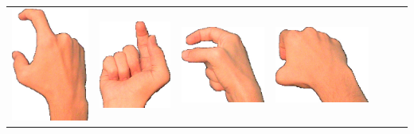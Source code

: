 \documentclass{article}
\begin{document}
\begin{center}
\begin{tabular}{r*{6}{c}}
\includegraphics[scale=0.1]{images/09-10-3.jpg}&
\includegraphics[scale=0.1]{images/09-10-4.jpg}&
\includegraphics[scale=0.1]{images/09-10-5.jpg}&
\includegraphics[scale=0.1]{images/09-10-6.jpg}\\

\end{tabular}
\end{center}
\end{document}
